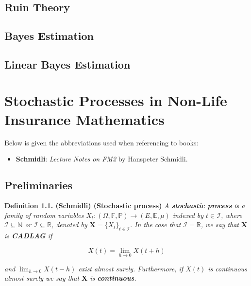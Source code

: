 \documentclass[a4paper,10pt,openany]{book}
\providecommand{\tightlist}{%
 \setlength{\itemsep}{0pt}\setlength{\parskip}{0pt}}
\begin{document}
\hypertarget{ruin-theory}{%
\section{Ruin Theory}\label{ruin-theory}}

\hypertarget{bayes-estimation}{%
\section{Bayes Estimation}\label{bayes-estimation}}

\hypertarget{linear-bayes-estimation}{%
\section{Linear Bayes Estimation}\label{linear-bayes-estimation}}

\hypertarget{stochastic-processes-in-non-life-insurance-mathematics}{%
\chapter{Stochastic Processes in Non-Life Insurance Mathematics}\label{stochastic-processes-in-non-life-insurance-mathematics}}

Below is given the abbreviations used when referencing to books:

\begin{itemize}
\tightlist
\item
  \textbf{Schmidli}: \emph{Lecture Notes on FM2} by Hanspeter Schmidli.\cite{schmidli}
\end{itemize}

\hypertarget{preliminaries}{%
\section{Preliminaries}\label{preliminaries}}

\textbf{Definition 1.1. (Schmidli) (Stochastic process)} \emph{A \textbf{stochastic process} is a family of random variables \(X_t : (\Omega,\mathbb F,\mathbb P) \to (E,\mathbb E,\mu)\) indexed by \(t\in \mathcal I\), where \(\mathcal I\subseteq \mathbb N\) or \(\mathcal I\subseteq \mathbb R\), denoted by \(\mathbf X=\{X_t\}_{t\in \mathcal I}\). In the case that \(\mathcal I=\mathbb R\), we say that \(\mathbf X\) is \textbf{CADLAG} if}

\[
X(t)=\lim_{h\to 0}X(t+h)
\]

\emph{and \(\lim_{h\to 0}X(t-h)\) exist almost surely. Furthermore, if \(X(t)\) is continuous almost surely we say that \(\mathbf X\) is \textbf{continuous}.}
\end{document}
